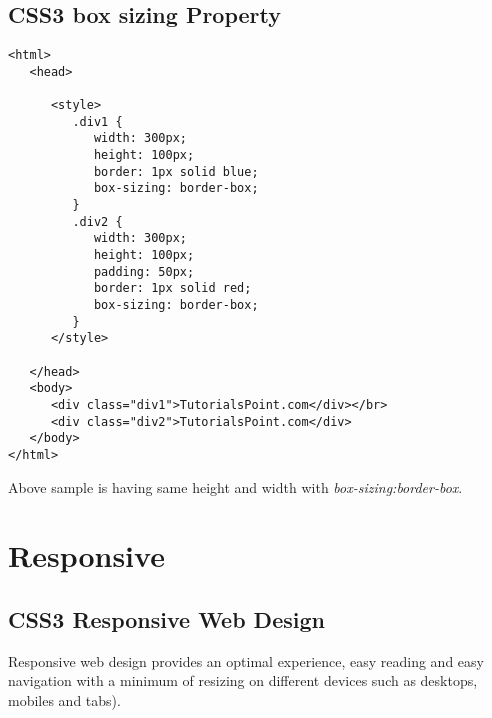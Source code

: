 \documentclass[a4paper,oneside]{book}
\numberwithin{equation}{chapter}
\begin{document}
\subsection{CSS3 box sizing Property}
\begin{verbatim}
<html>
   <head>
   
      <style>
         .div1 {
            width: 300px;
            height: 100px;
            border: 1px solid blue;
            box-sizing: border-box;
         }
         .div2 {
            width: 300px;
            height: 100px;
            padding: 50px;
            border: 1px solid red;
            box-sizing: border-box;
         }
      </style>
      
   </head>
   <body>
      <div class="div1">TutorialsPoint.com</div></br>
      <div class="div2">TutorialsPoint.com</div>
   </body>
</html>
\end{verbatim}
Above sample is having same height and width with \textit{box-sizing:border-box}.
\section{Responsive}
\subsection{CSS3 Responsive Web Design}
Responsive web design provides an optimal experience, easy reading and easy navigation with a minimum of resizing on different devices such as desktops, mobiles and tabs).
\end{document}
